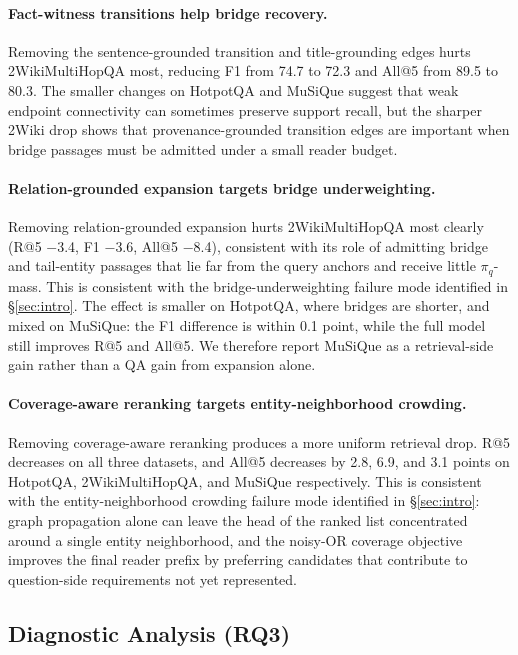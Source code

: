 \paragraph{Fact-witness transitions help bridge recovery.}
Removing the sentence-grounded transition and title-grounding edges
hurts 2WikiMultiHopQA most, reducing F1 from 74.7 to 72.3 and All@5
from 89.5 to 80.3. The smaller changes on HotpotQA and MuSiQue suggest
that weak endpoint connectivity can sometimes preserve support recall,
but the sharper 2Wiki drop shows that provenance-grounded transition
edges are important when bridge passages must be admitted under a small
reader budget.

\paragraph{Relation-grounded expansion targets bridge underweighting.}
Removing relation-grounded expansion hurts 2WikiMultiHopQA most clearly
(R@5 $-$3.4, F1 $-$3.6, All@5 $-$8.4), consistent with its role of
admitting bridge and tail-entity passages that lie far from the query
anchors and receive little $\pi_q$-mass. This is consistent with the
bridge-underweighting failure mode identified in \S\ref{sec:intro}. The effect is smaller on
HotpotQA, where bridges are shorter, and mixed on MuSiQue: the F1
difference is within 0.1 point, while the full model still improves
R@5 and All@5. We therefore report MuSiQue as a retrieval-side gain
rather than a QA gain from expansion alone.

\paragraph{Coverage-aware reranking targets entity-neighborhood crowding.}
Removing coverage-aware reranking produces a more uniform retrieval
drop. R@5 decreases on all three datasets, and All@5 decreases by 2.8,
6.9, and 3.1 points on HotpotQA, 2WikiMultiHopQA, and MuSiQue
respectively. This is consistent with the entity-neighborhood
crowding failure mode identified in \S\ref{sec:intro}: graph
propagation alone can leave the head of the
ranked list concentrated around a single entity neighborhood, and the
noisy-OR coverage objective improves the final reader prefix by
preferring candidates that contribute to question-side requirements
not yet represented.

\subsection{Diagnostic Analysis (RQ3)}
\label{sec:experiments:analysis}

